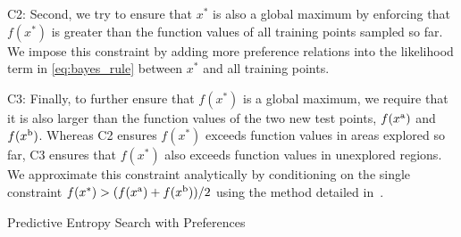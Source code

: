 C2: Second, we try to ensure that $x^*$ is also a global maximum by enforcing
that $f(x^*)$ is greater than the function values of all training points sampled
so far. We impose this constraint by adding more preference relations into the
likelihood term in \cref{eq:bayes_rule} between $x^*$ and all training points.

C3: Finally, to further ensure that $f(x^*)$ is a global maximum, we require
that it is also larger than the function values of the two new test points,
$f(x^{\mathrm{a}})$ and $f(x^{\mathrm{b}})$. Whereas C2 ensures $f(x^*)$ exceeds function
values in areas explored so far, C3 ensures that $f(x^*)$ also exceeds function
values in unexplored regions. We approximate this constraint analytically by
conditioning on the single constraint $f(x^*) > (f(x^{\mathrm{a}}) + f(x^{\mathrm{b}}))/2$
using the
method detailed in~\citep{xu2010estimation}.
\begin{algorithm}[t]
    \caption{Predictive Entropy Search with Preferences}
    \begin{algorithmic}[1]
            \EndFor{}
        \EndProcedure{}
        \Statex{}
        \EndFunction{}
    \end{algorithmic}\label{alg:pesp}
\end{algorithm}

